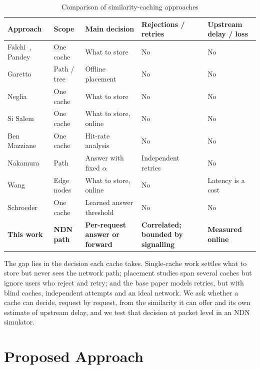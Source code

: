 \documentclass[11pt,a4paper]{article}
\renewcommand{\arraystretch}{1.45}
\begin{document}
\begin{table}[H]
\centering
\caption{Comparison of similarity-caching approaches}
\label{tab:related-work}
\footnotesize
\renewcommand{\arraystretch}{1.0}
\begin{tabularx}{\linewidth}{@{}>{\raggedright}p{3.2cm}>{\raggedright}p{1.8cm}>{\raggedright}X>{\raggedright}p{2.7cm}>{\raggedright\arraybackslash}p{2.4cm}@{}}
\toprule
\textbf{Approach} & \textbf{Scope} & \textbf{Main decision} & \textbf{Rejections / retries} &
\textbf{Upstream delay / loss} \\
\midrule
Falchi~\cite{falchi2008metric}, Pandey~\cite{pandey2009nn} & One cache & What to store & No & No \\
Garetto~\cite{garetto2021placement} & Path / tree & Offline placement & No & No \\
Neglia~\cite{neglia2022similarity} & One cache & What to store & No & No \\
Si Salem~\cite{sisalem2023acai} & One cache & What to store, online & No & No \\
Ben Mazziane~\cite{benmazziane2024ttl} & One cache & Hit-rate analysis & No & No \\
Nakamura~\cite{nakamura2024analysis} & Path & Answer with fixed $\alpha$ & Independent retries & No \\
Wang~\cite{wang2025bandit} & Edge nodes & What to store, online & No & Latency is a cost \\
Schroeder~\cite{schroeder2025vcache} & One cache & Learned answer threshold & No & No \\
\midrule
\textbf{This work} & \textbf{NDN path} & \textbf{Per-request answer or forward} &
\textbf{Correlated; bounded by signalling} & \textbf{Measured online} \\
\bottomrule
\end{tabularx}
\end{table}

The gap lies in the decision each cache takes. Single-cache work settles what to store but never
sees the network path; placement studies span several caches but ignore users who reject and retry;
and the base paper models retries, but with blind caches, independent attempts and an ideal network.
We ask whether a cache can decide, request by request, from the similarity it can offer and its own
estimate of upstream delay, and we test that decision at packet level in an NDN simulator.

\section{Proposed Approach}\label{sec:approach}
\end{document}

